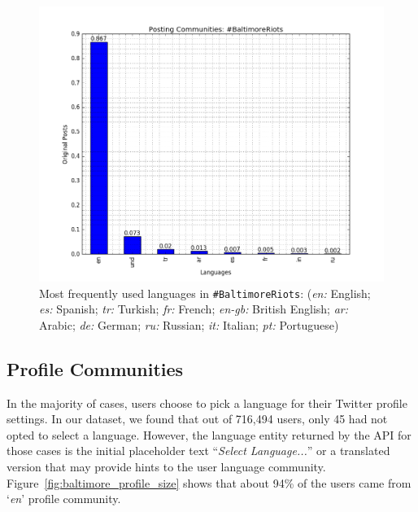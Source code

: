 \documentclass{llncs}
\begin{document}
\begin{figure}[htb]
\centering
\includegraphics[width=\columnwidth]{images/baltimore_langfreq.png}
\caption{Most frequently used languages in
  {\texttt{\#BaltimoreRiots}}: 
({\emph{en:}} English; {\emph{es:}} Spanish; {\emph{tr:}} Turkish;
  {\emph{fr:}} French; {\emph{en-gb:}} British English; {\emph{ar:}}
  Arabic; {\emph{de:}} German; {\emph{ru:}} Russian; {\emph{it:}}
  Italian; {\emph{pt:}} Portuguese)}
\label{fig:baltimore_langfreq}
\end{figure}

\subsection{Profile Communities}\label{baltimoreprofile}

In the majority of cases, users choose to pick a language for their
Twitter profile settings. In our dataset, we found that out of 716,494
users, only 45 had not opted to select a language. However, the
language entity returned by the API for those cases is the initial
placeholder text ``{\emph{Select Language...}}'' or a translated
version that may provide hints to the user language
community. Figure~\ref{fig:baltimore_profile_size} shows that about
94\% of the users came from `{\emph{en}}' profile community.
\end{document}
